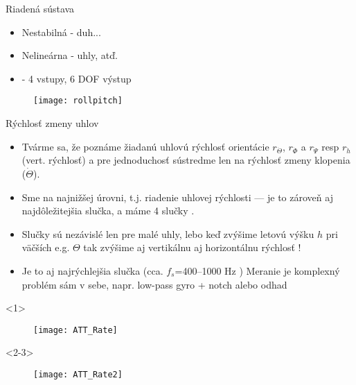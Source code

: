 \begin{frame}{Riadená sústava}
\begin{itemize}
  \item<1-> Nestabilná  - duh...
  \item<2-> Nelineárna  - uhly, atď.
  \item<3->  - 4 vstupy, 6 DOF výstup \citep{Douglas2018}
\end{itemize}
\begin{figure}
\centering
  \texttt{[image: rollpitch]}\\
\end{figure}
\end{frame}

\begin{frame}[t]{Rýchlosť zmeny uhlov}
\begin{itemize}
  \item<1-> Tvárme sa, že poznáme žiadanú uhlovú rýchlosť orientácie $r_{\dot{\Theta}}$, $r_{\dot{\Phi}}$ a $r_{\dot{\Psi}}$ resp $r_{\dot{h}}$ (vert. rýchlosť) a pre jednoduchosť sústredme len na rýchlosť zmeny klopenia ($\dot{\Theta}$).
  \item<2-> Sme na najnižšej úrovni, t.j. riadenie uhlovej rýchlosti  --- je to zároveň aj najdôležitejšia slučka, a máme 4 slučky \citep{AP:PID,PX4:PIDTuning}.
  \item<3-> Slučky sú nezávislé len pre malé uhly, lebo keď zvýšime letovú výšku $h$ pri väčších e.g. $\Theta$ tak zvýšime aj vertikálnu aj horizontálnu rýchlosť \citep{Douglas2018}!
  \item<4->  Je to aj najrýchlejšia slučka (cca. $f_s$=400--1000 Hz \citep{AP:PID,PX4:PIDTuning}) Meranie je komplexný problém sám v sebe, napr. low-pass gyro + notch \citep{Bresciani2020} alebo odhad
  \end{itemize}

  \begin{onlyenv}<1>
  \begin{figure}
\centering
  \texttt{[image: ATT\_Rate]}\\
\end{figure}
\end{onlyenv}

  \begin{onlyenv}<2-3>
  \begin{figure}
\centering
  \texttt{[image: ATT\_Rate2]}\\
\end{figure}
\end{onlyenv}
  \end{frame}



